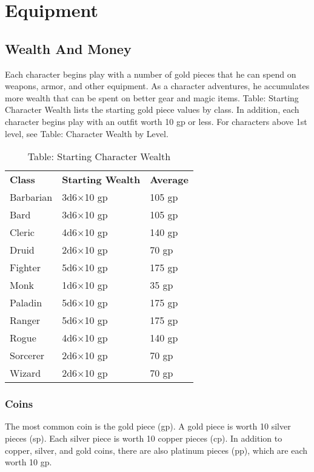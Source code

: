 \chapter{Equipment}
\section{Wealth And Money}

\label{f0}	
Each character begins play with a number of gold pieces that he can spend on weapons, armor, and other equipment. As a character adventures, he accumulates more wealth that can be spent on better gear and magic items. Table: Starting Character Wealth lists the starting gold piece values by class. In addition, each character begins play with an outfit worth 10 gp or less. For characters above 1st level, see Table: Character Wealth by Level.
\begin{table}[]
\sffamily
\caption{Table: Starting Character Wealth}
\begin{tabular}{lll}
\textbf{Class} & \textbf{Starting Wealth} & \textbf{Average}\\
Barbarian& 3d6$\times$10 gp& 105 gp \\
Bard& 3d6$\times$10 gp& 105 gp \\
Cleric& 4d6$\times$10 gp& 140 gp \\
Druid& 2d6$\times$10 gp& 70 gp \\
Fighter& 5d6$\times$10 gp& 175 gp \\
Monk& 1d6$\times$10 gp& 35 gp \\
Paladin& 5d6$\times$10 gp& 175 gp \\
Ranger& 5d6$\times$10 gp& 175 gp \\
Rogue& 4d6$\times$10 gp& 140 gp \\
Sorcerer& 2d6$\times$10 gp& 70 gp \\
Wizard& 2d6$\times$10 gp& 70 gp\\
\end{tabular}
\end{table}

\subsection{Coins}


The most common coin is the gold piece (gp). A gold piece is worth 10 silver pieces (sp). Each silver piece is worth 10 copper pieces (cp). In addition to copper, silver, and gold coins, there are also platinum pieces (pp), which are each worth 10 gp.

